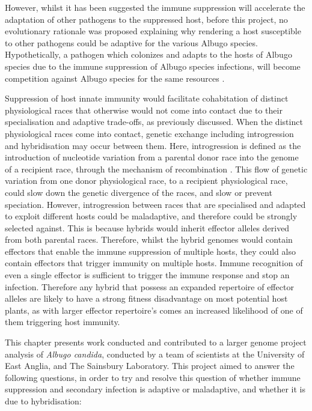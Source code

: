 However, whilst it has been suggested the immune suppression will accelerate the adaptation of other pathogens to the suppressed host, before this project, no evolutionary rationale was proposed explaining why rendering a host susceptible to other pathogens could be adaptive for the various Albugo species. Hypothetically, a pathogen which colonizes and adapts to the hosts of Albugo species due to the immune suppression of Albugo species infections, will become competition against Albugo species for the same resources \parencite{Cooper2008}⁠.

Suppression of host innate immunity would facilitate cohabitation of distinct physiological races that otherwise would not come into contact due to their specialisation and adaptive trade-offs, as previously discussed. When the distinct physiological races come into contact, genetic exchange including introgression and hybridisation may occur between them. Here, introgression is defined as the introduction of nucleotide variation from a parental donor race into the genome of a recipient race, through the mechanism of recombination \parencite{Hedrick2013}. This flow of genetic variation from one donor physiological race, to a recipient physiological race, could slow down the genetic divergence of the races, and slow or prevent speciation. However, introgression between races that are specialised and adapted to exploit different hosts could be maladaptive, and therefore could be strongly selected against. This is because hybrids would inherit effector alleles derived from both parental races. Therefore, whilst the hybrid genomes would contain effectors that enable the immune suppression of multiple hosts, they could also contain effectors that trigger immunity on multiple hosts. Immune recognition of even a single effector is sufficient to trigger the immune response and stop an infection. Therefore any hybrid that possess an expanded repertoire of effector alleles are likely to have a strong fitness disadvantage on most potential host plants, as with larger effector repertoire's comes an increased likelihood of one of them triggering host immunity.

This chapter presents work conducted and contributed to a larger genome project analysis of \textit{Albugo candida}, conducted by a team of scientists at the University of East Anglia, and The Sainsbury Laboratory. This project aimed to answer the following questions, in order to try and resolve this question of whether immune suppression and secondary infection is adaptive or maladaptive, and whether it is due to hybridisation:

